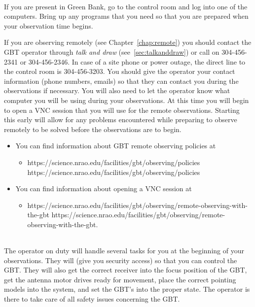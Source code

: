 \begin{description}[leftmargin=*]
\item [Step 5 - 30 minutes before your observation session]\ \\
If you are present in Green Bank, go to the control room and log into
one of the computers.  Bring up any programs that you need so that you are
prepared when your observation time begins.

If you are observing remotely (see Chapter~\ref{chap:remote}) you should
contact the \gls{GBT} operator through \textit{talk and draw}
(see~\ref{sec:talkanddraw}) or call on 304-456-2341 or 304-456-2346.  In case
of a site phone or power outage, the direct line to the control room is
304-456-3203. You should give the operator your contact information (phone
numbers, emails) so that they can contact you during the observations
if necessary.  You will also need to let the operator know what computer
you will be using during your observations.  At this time you will begin
to open a \gls{VNC} session that you will use for the remote observations.
Starting this early will allow for any problems encountered while preparing
to observe remotely to be solved before the observations are to begin.
\vspace{-5mm}
\begin{itemize}[leftmargin=*,itemsep=0pt]
\item You can find information about \gls{GBT} remote observing policies at\\
\vspace{-5mm}
\begin{itemize}[itemsep=0pt]
\item \htmladdnormallink
{https://science.nrao.edu/facilities/gbt/observing/policies}
{https://science.nrao.edu/facilities/gbt/observing/policies}
\end{itemize}
\item You can find information about opening a \gls{VNC} session at\\
\vspace{-5mm}
\begin{itemize}[itemsep=0pt]
\item \htmladdnormallink
{https://science.nrao.edu/facilities/gbt/observing/remote-observing-with-the-gbt}
{https://science.nrao.edu/facilities/gbt/observing/remote-observing-with-the-gbt}.
\end{itemize}
\end{itemize}

\newpage

\item [Step 6 - Operator responsibilities]\ \\
The operator on duty will handle several tasks for you at the beginning of
your observations.  They will  (give you security
access) so that you can control the \gls{GBT}.  They will also get the correct
receiver into the focus position of the \gls{GBT}, get the antenna motor drives
ready for movement, place the correct pointing models into the system, and set
the \gls{GBT}'s  into the proper state.  The operator is there
to take care of all safety issues concerning the \gls{GBT}.


\end{description}
